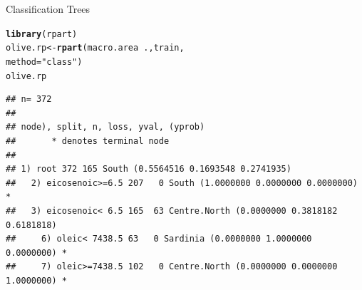\documentclass[10pt,xcolor=dvipsnames]{beamer}\usepackage[]{graphicx}\usepackage[]{color}
\makeatletter
\newcommand{\hlnum}[1]{\textcolor[rgb]{0.686,0.059,0.569}{#1}}%
\newcommand{\hlstr}[1]{\textcolor[rgb]{0.192,0.494,0.8}{#1}}%
\newcommand{\hlopt}[1]{\textcolor[rgb]{0,0,0}{#1}}%
\newcommand{\hlstd}[1]{\textcolor[rgb]{0.345,0.345,0.345}{#1}}%
\newcommand{\hlkwb}[1]{\textcolor[rgb]{0.69,0.353,0.396}{#1}}%
\newcommand{\hlkwc}[1]{\textcolor[rgb]{0.333,0.667,0.333}{#1}}%
\newcommand{\hlkwd}[1]{\textcolor[rgb]{0.737,0.353,0.396}{\textbf{#1}}}%
\newenvironment{kframe}{%
 \def\at@end@of@kframe{}%
 \ifinner\ifhmode%
  \def\at@end@of@kframe{\end{minipage}}%
  \begin{minipage}{\columnwidth}%
 \fi\fi%
 \def\FrameCommand##1{\hskip\@totalleftmargin \hskip-\fboxsep
 \colorbox{shadecolor}{##1}\hskip-\fboxsep
     \hskip-\linewidth \hskip-\@totalleftmargin \hskip\columnwidth}%
 \MakeFramed {\advance\hsize-\width
   \@totalleftmargin\z@ \linewidth\hsize
   \@setminipage}}%
 {\par\unskip\endMakeFramed%
 \at@end@of@kframe}
\newenvironment{knitrout}{}{} %
\makeatother
\begin{document}


\begin{frame}[fragile]{Classification Trees}
\begin{knitrout}\footnotesize
{}\color{fgcolor}\begin{kframe}
\begin{alltt}
\hlkwd{library}\hlstd{(rpart)}
\hlstd{olive.rp} \hlkwb{<-} \hlkwd{rpart}\hlstd{(macro.area}\hlopt{~}\hlstd{., train,}
          \hlkwc{method}\hlstd{=}\hlstr{"class"}\hlstd{)}
\hlstd{olive.rp}
\end{alltt}
\begin{verbatim}
## n= 372 
## 
## node), split, n, loss, yval, (yprob)
##       * denotes terminal node
## 
## 1) root 372 165 South (0.5564516 0.1693548 0.2741935)  
##   2) eicosenoic>=6.5 207   0 South (1.0000000 0.0000000 0.0000000) *
##   3) eicosenoic< 6.5 165  63 Centre.North (0.0000000 0.3818182 0.6181818)  
##     6) oleic< 7438.5 63   0 Sardinia (0.0000000 1.0000000 0.0000000) *
##     7) oleic>=7438.5 102   0 Centre.North (0.0000000 0.0000000 1.0000000) *
\end{verbatim}
\end{kframe}
\end{knitrout}
\end{frame}
\end{document}
